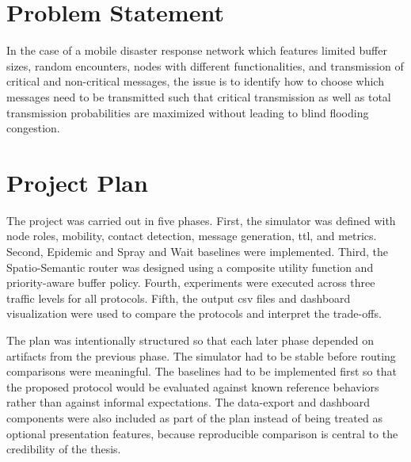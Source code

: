 \section{Problem Statement}
In the case of a mobile disaster response network which features limited buffer sizes,
random encounters, nodes with different functionalities, and transmission of critical and non-critical messages, the issue is to identify how to choose which messages need to be transmitted such that critical transmission as well as total transmission probabilities are maximized without leading to blind flooding congestion.

\section{Project Plan}
The project was carried out in five phases. First, the simulator was defined with node roles, mobility, contact detection, message generation, \ac{ttl}, and metrics. Second, Epidemic and Spray and Wait baselines were implemented. Third, the Spatio-Semantic router was designed using a composite utility function and priority-aware buffer policy. Fourth, experiments were executed across three traffic levels for all protocols. Fifth, the output \ac{csv} files and dashboard visualization were used to compare the protocols and interpret the trade-offs.

The plan was intentionally structured so that each later phase depended on artifacts from the previous phase. The simulator had to be stable before routing comparisons were meaningful. The baselines had to be implemented first so that the proposed protocol would be evaluated against known reference behaviors rather than against informal expectations. The data-export and dashboard components were also included as part of the plan instead of being treated as optional presentation features, because reproducible comparison is central to the credibility of the thesis.

\begin{table}[h!]
	\centering
	\caption{Protocol comparison focus}
	\renewcommand{\arraystretch}{1.3}
	\label{tab:protocol_focus}
\end{table}
